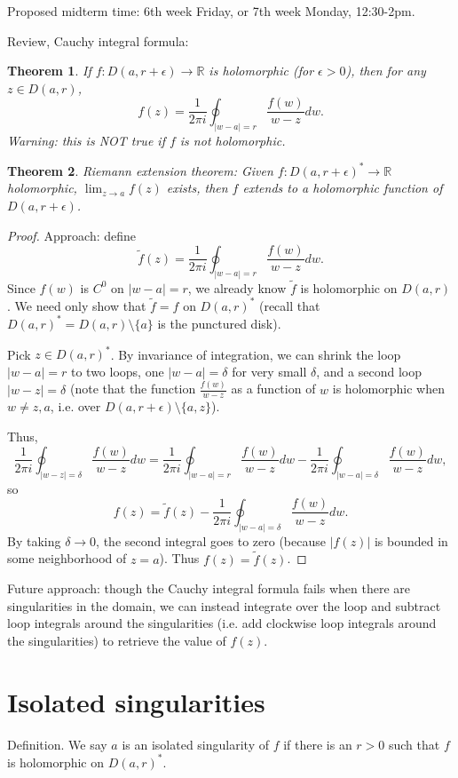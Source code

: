 \documentclass{artikel3}
\date{\formatdate{2012}{04}{25}}
\newcommand{\abs}[1]{\left|#1\right|}
\newcommand{\alt}[1]{\tilde{#1}}
\newcommand{\complex}{\mathbb{R}}
\newtheorem{thm}{Theorem}
\numberwithin{equation}{enumi}
\begin{document}
Proposed midterm time: 6th week Friday, or 7th week Monday,
12:30-2pm.

Review, Cauchy integral formula:
\begin{thm}
	If $f:D(a,r+\epsilon)\to \complex$ is holomorphic (for $\epsilon>0$),
	then for any $z\in D(a,r)$, \[
		f(z)=\frac{1}{2\pi i}\oint_{\abs{w-a}=r}\frac{f(w)}{w-z}dw.
	\] Warning: this is NOT true if $f$ is not holomorphic.
\end{thm}

\begin{thm}
	Riemann extension theorem:
	Given $f:D(a,r+\epsilon)^*\to\complex$
	holomorphic, $\lim_{z\to a}f(z)$ exists,
	then $f$ extends to a holomorphic function of $D(a,r+\epsilon)$.
\end{thm}
\begin{proof}
	Approach: define \[
		\alt{f}(z)=\frac{1}{2\pi i}\oint_{\abs{w-a}=r}\frac{f(w)}{w-z}dw.
	\] Since $f(w)$ is $C^0$ on $\abs{w-a}=r$, we already know
	$\alt{f}$ is holomorphic on $D(a,r)$.  We need only show
	that $\alt{f}=f$ on $D(a,r)^*$ (recall that $D(a,r)^*=D(a,r)\setminus\{a\}$
	is the punctured disk).
	
	Pick $z\in D(a,r)^*$.  By invariance of integration, we can
	shrink the loop $\abs{w-a}=r$ to two loops, one $\abs{w-a}=\delta$ for very
	small $\delta$, and a second loop $\abs{w-z}=\delta$ (note
	that the function $\frac{f(w)}{w-z}$ as a function of $w$
	is holomorphic when $w\neq z,a$, i.e. over $D(a,r+\epsilon)\setminus\{a,z\}$).
	
	Thus, \[
		\frac{1}{2\pi i}\oint_{\abs{w-z}=\delta}\frac{f(w)}{w-z}dw
		= \frac{1}{2\pi i}\oint_{\abs{w-a}=r}\frac{f(w)}{w-z}dw
		- \frac{1}{2\pi i}\oint_{\abs{w-a}=\delta}\frac{f(w)}{w-z}dw,
	\] so \[
		f(z)=\alt{f}(z)-\frac{1}{2\pi i}\oint_{\abs{w-a}=\delta}\frac{f(w)}{w-z}dw.
	\] By taking $\delta\to 0$, the second integral goes to zero (because $\abs{f(z)}$
	is bounded in some neighborhood of $z=a$).  Thus $f(z)=\alt{f}(z)$.
\end{proof}

Future approach: though the Cauchy integral formula fails when there are
singularities in the domain, we can instead integrate over the loop and subtract
loop integrals around the singularities (i.e. add clockwise loop integrals
around the singularities) to retrieve the value of $f(z)$.

\section{Isolated singularities}
Definition.  We say $a$ is an isolated singularity of $f$ if
there is an $r>0$ such that $f$ is holomorphic on $D(a,r)^*$.
\end{document}
